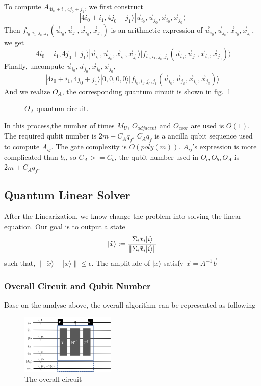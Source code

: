 \documentclass[%
 reprint,
 amsmath,amssymb,
pra,
]{revtex4-1}
\begin{document}
To compute $A_{4i_0+i_1,4j_0+j_1}$, we first construct
$$
|4i_0+i_1,4j_0+j_1\rangle|\vec{u}_{i_0},\vec{u}_{j_0},\vec{x}_{i_0},\vec{x}_{j_0}\rangle
$$
Then $f_{i_0,i_1,j_0,j_1}(\vec{u}_{i_0},\vec{u}_{j_0},\vec{x}_{i_0},\vec{x}_{j_0})$  is an arithmetic expression of $\vec{u}_{i_0},\vec{u}_{j_0},\vec{x}_{i_0},\vec{x}_{j_0}$, we get
$$
|4i_0+i_1,4j_0+j_1\rangle|\vec{u}_{i_0},\vec{u}_{j_0},\vec{x}_{i_0},\vec{x}_{j_0}\rangle|f_{i_0,i_1,j_0,j_1}(\vec{u}_{i_0},\vec{u}_{j_0},\vec{x}_{i_0},\vec{x}_{j_0})\rangle
$$
Finally, uncompute $\vec{u}_{i_0},\vec{u}_{j_0},\vec{x}_{i_0},\vec{x}_{j_0}$,
$$
|4i_0+i_1,4j_0+j_1\rangle|0,0,0,0\rangle|f_{i_0,i_1,j_0,j_1}(\vec{u}_{i_0},\vec{u}_{j_0},\vec{x}_{i_0},\vec{x}_{j_0})\rangle
$$
And we realize $O_A$, the corresponding quantum circuit is shown in fig.~\ref{OA} 
\begin{figure}[htbp]
    \caption{$O_A$ quantum circuit. }
    \label{OA}
\end{figure}
In this process,the number of times $M_U$, $O_{adjacent}$ and $O_{coor}$ are used is $O(1)$. The required qubit number is $2m+C_Aq_f$, $C_Aq_f$ is a ancilla qubit sequence used to compute $A_{ij}$. The gate complexity is $O(poly(m))$. $A_{ij}$'s expression is more complicated than $b_i$, so $C_A>=C_b$, the qubit number used in $O_l,O_b,O_A$ is $2m+C_Aq_f$.



\subsection{Quantum Linear Solver}

After the Linearization, we know change the problem into solving the linear
equation. Our goal is to output a state 
\begin{equation}
|\tilde{x}\rangle:=\frac{\Sigma_i \tilde{x}_i|i\rangle}
{\lVert \Sigma_i \tilde{x}_i |i\rangle\rVert}\notag
\end{equation}
such that, $\lVert |\tilde{x}\rangle-|x\rangle\rVert\leqslant\epsilon$. 
The amplitude of $|x\rangle$ satisfy $\vec{x}=A^{-1}\vec{b}$

\subsubsection{Overall Circuit and Qubit Number}
Base on the analyse above, the overall algorithm can be represented as 
following
\begin{figure}[htbp]
\centering
\includegraphics[width=0.4\textwidth]{Fig/overall}
\caption{The overall circuit}
\label{o}
\end{figure}
\end{document}
